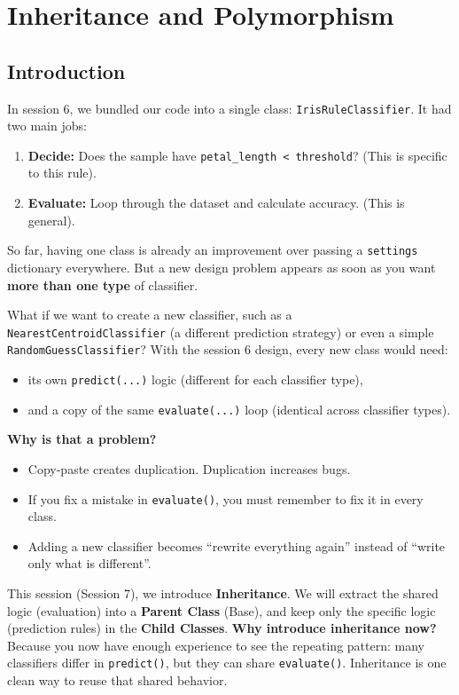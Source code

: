 \chapter{Inheritance and Polymorphism}

\section{Introduction}
In session 6, we bundled our code into a single class: \texttt{IrisRuleClassifier}.
It had two main jobs:
\begin{enumerate}
    \item \textbf{Decide:} Does the sample have \texttt{petal\_length < threshold}? (This is specific to this rule).
    \item \textbf{Evaluate:} Loop through the dataset and calculate accuracy. (This is general).
\end{enumerate}

So far, having one class is already an improvement over passing a \texttt{settings} dictionary everywhere.
But a new design problem appears as soon as you want \textbf{more than one type} of classifier.

\noindent
What if we want to create a new classifier, such as a \texttt{NearestCentroidClassifier} (a different prediction strategy) or even a simple \texttt{RandomGuessClassifier}?
With the session 6 design, every new class would need:
\begin{itemize}\setlength{\itemsep}{2pt}
    \item its own \texttt{predict(...)} logic (different for each classifier type),
    \item and a copy of the same \texttt{evaluate(...)} loop (identical across classifier types).
\end{itemize}

\noindent
\textbf{Why is that a problem?}
\begin{itemize}\setlength{\itemsep}{2pt}
    \item Copy-paste creates duplication. Duplication increases bugs.
    \item If you fix a mistake in \texttt{evaluate()}, you must remember to fix it in every class.
    \item Adding a new classifier becomes ``rewrite everything again'' instead of ``write only what is different''.
\end{itemize}

This session (Session 7), we introduce \textbf{Inheritance}.
We will extract the shared logic (evaluation) into a \textbf{Parent Class} (Base), and keep only the specific logic (prediction rules) in the \textbf{Child Classes}.
\noindent
\textbf{Why introduce inheritance now?} Because you now have enough experience to see the repeating pattern:
many classifiers differ in \texttt{predict()}, but they can share \texttt{evaluate()}.
Inheritance is one clean way to reuse that shared behavior.

